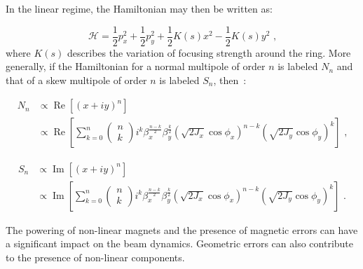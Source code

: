In the linear regime, the Hamiltonian may then be written as:

\begin{equation}
    \mathcal{H} = \frac{1}{2} p_x^2 + \frac{1}{2} p_y^2 + \frac{1}{2} K(s) x^2 - \frac{1}{2} K(s) y^2 \text{ ,}
    \label{equation:hamiltonian_linear_lattice}
\end{equation}
where \(K(s)\) describes the variation of focusing strength around the ring.
More generally, if the Hamiltonian for a normal multipole of order \(n\) is labeled \(N_n\) and that of a skew multipole of order \(n\) is labeled \(S_n\), then~\cite{PHD:Maclean, PHD:Persson}:

\begin{equation}
    \begin{aligned}
        N_n & \propto \operatorname{Re} \left[(x + i y)^n \right] \\
            & \propto \operatorname{Re} \left[ \sum_{k=0}^n \left(
                \begin{array}{l}
                    n \\
                    k
                \end{array} \right) 
            i^k \beta_x^{\frac{n-k}{2}} \beta_y^{\frac{k}{2}} \left(\sqrt{2 J_x} \cos \phi_x \right)^{n-k} \left( \sqrt{2 J_y} \cos \phi_y \right)^k \right] \text{ ,}
    \end{aligned}
    \label{equation:hamiltonian_prop_normal_multipoles}
\end{equation}

\begin{equation}
    \begin{aligned}
        S_n & \propto \operatorname{Im} \left[(x + i y)^n \right] \\
            & \propto \operatorname{Im} \left[ \sum_{k=0}^n \left(
                \begin{array}{l}
                    n \\
                    k
                \end{array} \right) 
            i^k \beta_x^{\frac{n-k}{2}} \beta_y^{\frac{k}{2}} \left(\sqrt{2 J_x} \cos \phi_x \right)^{n-k} \left( \sqrt{2 J_y} \cos \phi_y \right)^k \right] \text{ .}
    \end{aligned}
    \label{equation:hamiltonian_prop_skew_multipoles}
\end{equation}

The powering of non-linear magnets and the presence of magnetic errors can have a significant impact on the beam dynamics.
Geometric errors can also contribute to the presence of non-linear components.

